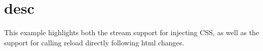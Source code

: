 \chapter{desc}
\hypertarget{md__d_1_2_g_i_t_2_food_link_2foodlink_8client_2node__modules_2bs-recipes_2recipes_2gulp_8sass_2desc}{}\label{md__d_1_2_g_i_t_2_food_link_2foodlink_8client_2node__modules_2bs-recipes_2recipes_2gulp_8sass_2desc}
This example highlights both the stream support for injecting CSS, as well as the support for calling {\ttfamily reload} directly following html changes. 
